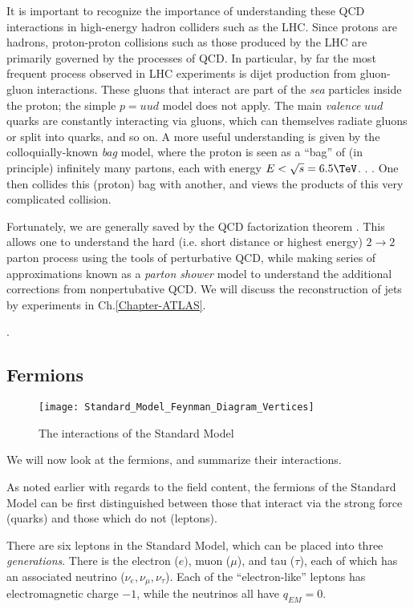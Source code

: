 It is important to recognize the importance of understanding these QCD interactions in high-energy hadron colliders such as the LHC.
Since protons are hadrons, proton-proton collisions such as those produced by the LHC are primarily governed by the processes of QCD.
In particular, by far the most frequent process observed in LHC experiments is dijet production from gluon-gluon interactions.
These gluons that interact are part of the \textit{sea} particles inside the proton; the simple $p = uud$ model does not apply.
The main \textit{valence} $uud$ quarks are constantly interacting via gluons, which can themselves radiate gluons or split into quarks, and so on.
A more useful understanding is given by the colloquially-known \textit{bag} model, where the proton is seen as a ``bag'' of (in principle) infinitely many partons, each with energy $ E < \sqrt{s} = 6.5 \TeV$.
.
.
One then collides this (proton) bag with another, and views the products of this very complicated collision.

Fortunately, we are generally saved by the QCD factorization theorem .
This allows one to understand the hard (i.e. short distance or highest energy) $2 \rightarrow 2$ parton process using the tools of perturbative QCD, while making series of approximations known as a \textit{parton shower} model to understand the additional corrections from nonpertubative QCD.
We will discuss the reconstruction of jets by experiments in Ch.\ref{Chapter-ATLAS}.

.

\subsection{Fermions}

\begin{figure}\label{fig:sm_interactions}
\caption{The interactions of the Standard Model}
\texttt{[image: Standard\_Model\_Feynman\_Diagram\_Vertices]}
\end{figure}

We will now look at the fermions, and summarize their interactions.

As noted earlier with regards to the field content, the fermions of the Standard Model can be first distinguished between those that interact via the strong force (quarks) and those which do not (leptons).

There are six leptons in the Standard Model, which can be placed into three \textit{generations}. 
There is the electron ($e)$, muon ($\mu$), and tau ($\tau$), each of which has an associated neutrino ($\nu_e, \nu_\mu, \nu_\tau$).
Each of the ``electron-like'' leptons has electromagnetic charge $-1$, while the neutrinos all have $q_{EM} = 0$.

